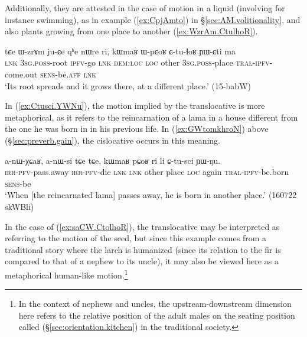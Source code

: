 Additionally, they are attested in the case of motion in a liquid (involving for instance swimming), as in example (\ref{ex:CpjAmto}) in §\ref{sec:AM.volitionality}, and also plants growing from one place to another (\ref{ex:WzrAm.CtulhoR}).

\begin{exe}
\ex \label{ex:WzrAm.CtulhoR}
\gll tɕe ɯ-zrɤm ju-ɕe qʰe nɯre ri, kɯmaʁ ɯ-pɕoʁ ɕ-tu-ɬoʁ ɲɯ-ɕti ma   \\
\textsc{lnk} \textsc{3sg}.\textsc{poss}-root \textsc{ipfv}-go \textsc{lnk} \textsc{dem}:\textsc{loc} \textsc{loc} other \textsc{3sg}.\textsc{poss}-place \textsc{tral}-\textsc{ipfv}-come.out \textsc{sens}-be.\textsc{aff} \textsc{lnk} \\
\glt  `Its root spreads and it grows there, at a different place.' (15-babW)
\end{exe}

In (\ref{ex:Ctusci.YWNu}), the motion implied by the translocative is more metaphorical, as it refers to the reincarnation of a lama in a house different from the one he was born in in his previous life. In (\ref{ex:GWtomkhroN}) above (§\ref{sec:preverb.gain}), the cislocative occurs in this meaning.


\begin{exe}
\ex \label{ex:Ctusci.YWNu}
\gll a-nɯ-χɕaʁ, a-nɯ-si tɕe tɕe, kɯmaʁ pɕoʁ ri li ɕ-tu-sci ɲɯ-ŋu. \\
\textsc{irr}-\textsc{pfv}-pass.away \textsc{irr}-\textsc{pfv}-die \textsc{lnk} \textsc{lnk} other place \textsc{loc} again \textsc{tral}-\textsc{ipfv}-be.born \textsc{sens}-be \\
\glt `When [the reincarnated lama] passes away, he is born in another place.' (160722 skWBli)
\end{exe}

In the case of (\ref{ex:saCW.CtolhoR}), the translocative may be interpreted as referring to the motion of the seed, but since this example comes from a traditional story where the larch is humanized (since its relation to the fir is compared to that of a nephew to its uncle), it may also be viewed here as a metaphorical human-like motion.\footnote{
In the context of nephews and uncles, the upstream-downstream dimension here refers to the relative position of the adult males on the seating position called   (§\ref{sec:orientation.kitchen}) in the traditional society. } 

